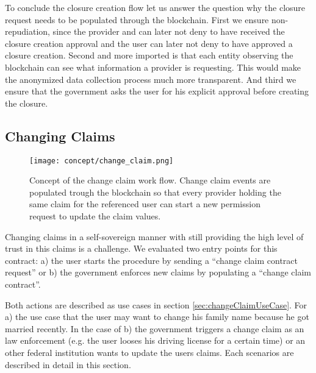 To conclude the closure creation flow let us answer the question why the closure request needs to be populated through the blockchain. First we ensure non-repudiation, since the provider and can later not deny to have received the closure creation approval and the user can later not deny to have approved a closure creation. Second and more imported is that each entity observing the blockchain can see what information a provider is requesting. This would make the anonymized data collection process much more transparent. And third we ensure that the government asks the user for his explicit approval before creating the closure. 

\subsection{Changing Claims}

\begin{figure}
 \texttt{[image: concept/change\_claim.png]}
 \centering
\caption{Concept of the change claim work flow. Change claim events are populated trough the blockchain so that every provider holding the same claim for the referenced user can start a new permission request to update the claim values.}
\label{fig:changeClaimsFig}
\end{figure}

Changing claims in a self-sovereign manner with still providing the high level of trust in this claims is a challenge. We evaluated two entry points for this contract: a) the user starts the procedure by sending a “change claim contract request” or b) the government enforces new claims by populating a “change claim contract”. 

Both actions are described as use cases in section \ref{sec:changeClaimUseCase}. For a) the use case that the user may want to change his family name because he got married recently. In the case of b) the government triggers a change claim as an law enforcement (e.g. the user looses his driving license for a certain time) or an other federal institution wants to update the users claims. Each scenarios are described in detail in this section. 

